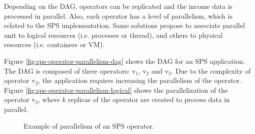 Depending on the DAG, operators can be replicated and the income data is processed in parallel. Also, each operator has a level of parallelism, which is related to the SPS implementation. Same solutions propose to associate parallel unit to logical resources (i.e. processes or thread), and others to physical resources (i.e. containers or VM).

Figure \ref{fig:sps-operator-parallelism-dag} shows the DAG for an SPS application. The DAG is composed of three operators: $\text{v}_1$, $\text{v}_2$ and $\text{v}_3$. Due to the complexity of operator $\text{v}_2$, the application requires increasing the parallelism of the operator. Figure \ref{fig:sps-operator-parallelism-logical} shows the parallelization of the operator $\text{v}_2$, where $k$ replicas of the operator are created to process data in parallel.

\begin{figure}[!ht]
\begin{center}

\vspace*{0.5cm}

\caption{Example of parallelism of an SPS operator.}
\label{fig:sps-operator-parallelism}
\end{center}
\end{figure}

